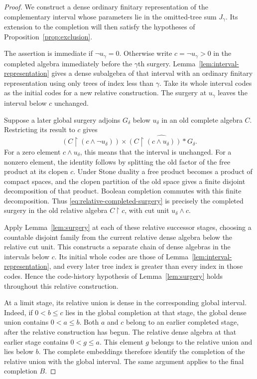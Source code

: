 \documentclass[11pt]{article}
\theoremstyle{definition}
\theoremstyle{remark}
\newcommand{\restr}{\mathbin{\upharpoonright}}
\begin{document}
\begin{proof}
We construct a dense ordinary finitary representation of the complementary
interval whose parameters lie in the omitted-tree sum $J_\gamma$.
Its extension to the completion will then satisfy the hypotheses of
Proposition~\ref{prop:exclusion}.

The assertion is immediate if $\neg u_\gamma=0$.  Otherwise write
$c=\neg u_\gamma>0$ in the completed algebra immediately before the
$\gamma$th surgery.  Lemma~\ref{lem:interval-representation} gives a
dense subalgebra of that interval with an ordinary finitary representation
using only trees of index less than $\gamma$.  Take its whole interval
codes as the initial codes for a new relative construction.  The surgery
at $u_\gamma$ leaves the interval below $c$ unchanged.

Suppose a later global surgery adjoins $G_\delta$ below $u_\delta$ in an
old complete algebra $C$.  Restricting its result to $c$ gives
\begin{equation}\label{eq:relative-completed-surgery}
 (C\restr(c\wedge\neg u_\delta))\times
 \widehat{(C\restr(c\wedge u_\delta))*G_\delta}.
\end{equation}
For a zero element $c\wedge u_\delta$, this means that the interval is
unchanged.  For a nonzero element, the identity follows by splitting the
old factor of the free product at its clopen $c$.  Under Stone duality a
free product becomes a product of compact spaces, and the clopen
partition of the old space gives a finite disjoint decomposition of that
product.  Boolean completion commutes with this finite decomposition.
Thus \eqref{eq:relative-completed-surgery} is precisely the completed
surgery in the old relative algebra $C\restr c$, with cut unit
$u_\delta\wedge c$.

Apply Lemma~\ref{lem:surgery} at each of these relative successor stages,
choosing a countable disjoint family from the current relative dense
algebra below the relative cut unit.  This constructs a separate chain of
dense algebras in the intervals below $c$.  Its initial whole codes are
those of Lemma~\ref{lem:interval-representation}, and every later tree
index is greater than every index in those codes.  Hence the code-history
hypothesis of Lemma~\ref{lem:surgery} holds throughout this relative
construction.

At a limit stage, its relative union is dense in the corresponding global
interval.  Indeed, if $0<b\leq c$ lies in the global completion at that
stage, the global dense union contains $0<a\leq b$.  Both $a$ and $c$
belong to an earlier completed stage, after the relative construction
has begun.  The relative dense algebra at that earlier stage contains
$0<g\leq a$.  This element $g$ belongs to the relative union and lies
below $b$.  The complete embeddings therefore identify the completion of
the relative union with the global interval.  The same argument applies
to the final completion $B$.


\end{proof}
\end{document}
